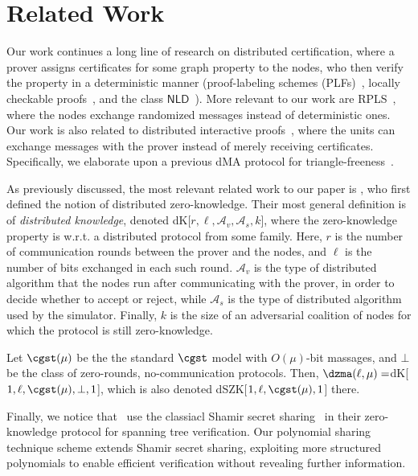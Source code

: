 \section{Related Work}
Our work continues a long line of research on distributed certification, where a prover assigns certificates for some graph property to the nodes, who then verify the property in a deterministic manner (proof-labeling schemes (PLFs)~\cite{KKP10}, locally checkable proofs~\cite{GS16}, and the class $\mathsf{NLD}$~\cite{FKP13}).
More relevant to our work are RPLS~\cite{FraigniaudPP19}, where the nodes   exchange randomized messages instead of deterministic ones.
Our work is also related to distributed interactive proofs~\cite{KOS18}, where the units can exchange messages with the prover instead of merely receiving certificates. 
Specifically, we elaborate upon a previous dMA protocol for triangle-freeness~\cite{CrescenziFP19}.

As previously discussed, the most relevant related work to our paper is \cite{BickKO22}, who first defined the notion of distributed zero-knowledge. 
%
%
Their most general definition is of \emph{distributed knowledge}, denoted dK[$r,\ell,\mathcal{A}_v,\mathcal{A}_s,k$],
where the zero-knowledge property is w.r.t. a distributed protocol from some family.
Here, $r$ is the number of communication rounds between the prover and the nodes, and $\ell$ is the number of bits exchanged in each such  round. 
$\mathcal{A}_v$ is the type of distributed algorithm that the nodes run after communicating with the prover, in order to decide whether to accept or reject, while
$\mathcal{A}_s$ is the type of distributed algorithm used by the simulator. 
Finally, $k$ is the size of an adversarial coalition of nodes for which the protocol is still zero-knowledge.
%

%
Let $\cgst(\mu)$ be the the standard $\cgst$ model with $O(\mu)$-bit massages,
and $\bot$ be the class of zero-rounds, no-communication protocols.
%
%
%
%
Then, $\dzma(\ell,\mu)=$dK[$1,\ell,\cgst(\mu),\bot,1$], which is also denoted dSZK[$1,\ell,\cgst(\mu),1$] there.

Finally, we notice that~\cite{BickKO22} use the classiacl Shamir secret sharing~\cite{Shamir79} in their zero-knowledge protocol for spanning tree verification. 
Our polynomial sharing technique scheme extends Shamir secret sharing, exploiting more structured polynomials to enable efficient verification without revealing further information.

%


%
%
%